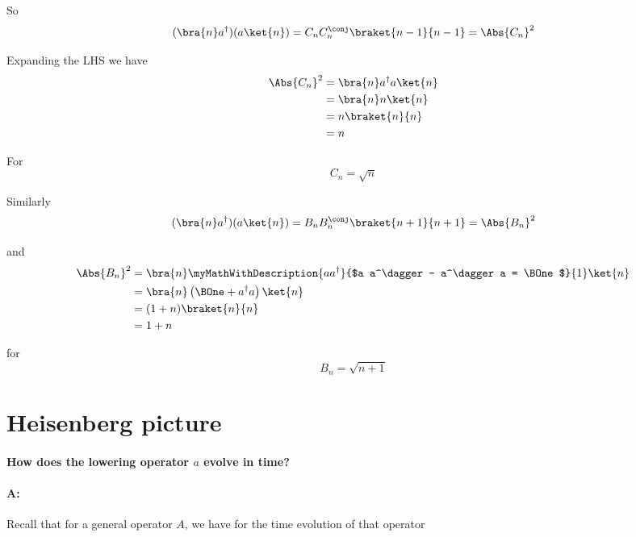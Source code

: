 So
\begin{equation}\label{eqn:PHY356FLecture11:230}
(\bra{n} a^\dagger) (a \ket{n}) = C_n C_n^\conj \braket{n-1}{n-1} = \Abs{C_n}^2
\end{equation}

Expanding the LHS we have
\begin{align*}
\Abs{C_n}^2 &=
\bra{n} a^\dagger a \ket{n} \\
&=
\bra{n} n \ket{n} \\
&=
n \braket{n}{n} \\
&=
n
\end{align*}

For
\begin{equation}\label{eqn:PHY356FLecture11:240}
C_n = \sqrt{n}
\end{equation}

Similarly
\begin{equation}\label{eqn:PHY356FLecture11:250}
(\bra{n} a^\dagger) (a \ket{n}) = B_n B_n^\conj \braket{n+1}{n+1} = \Abs{B_n}^2
\end{equation}

and
\begin{align*}
\Abs{B_n}^2 &=
\bra{n} \myMathWithDescription{a a^\dagger}{$a a^\dagger - a^\dagger a = \BOne$}{1} \ket{n} \\
&=
\bra{n} \left( \BOne + a^\dagger a \right) \ket{n} \\
&=
(1 + n) \braket{n}{n} \\
&=
1 + n
\end{align*}

for
\begin{equation}\label{eqn:PHY356FLecture11:260}
B_n = \sqrt{n + 1}
\end{equation}

\section{Heisenberg picture}

\paragraph{How does the lowering operator $a$ evolve in time?}

\paragraph{A:} Recall that for a general operator $A$, we have for the time evolution of that operator

